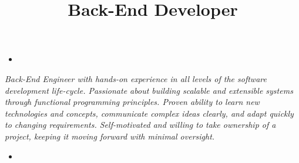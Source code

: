 \documentclass[11pt,a4paper,sans]{moderncv} %
\title{Back-End Developer}
\begin{document}
\makecvtitle %


\begin{minipage}[t]{0.17\textwidth}
    \begin{itemize}
        \item[] 
    \end{itemize}
\end{minipage}
\begin{minipage}[c]{0.80\textwidth}
\begin{center}
 \itshape Back-End Engineer with hands-on experience in all levels of the software development life-cycle. Passionate about building scalable and extensible systems through functional programming principles. Proven ability to learn new technologies and concepts, communicate complex ideas clearly, and adapt quickly to changing requirements. Self-motivated and willing to take ownership of a project, keeping it moving forward with minimal oversight. 
\end{center}
\end{minipage}
\begin{minipage}[t]{0.17\textwidth}
    \begin{itemize}
        \item[] 
    \end{itemize}
\end{minipage}
\vspace{0.5em}



\end{document}
